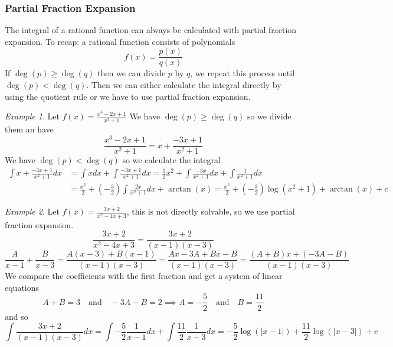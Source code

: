 \documentclass[english,titlepage]{uzhpub}
\theoremstyle{definition}
\theoremstyle{plain}
\theoremstyle{remark}
\theoremstyle{example}
\newtheorem*{example}{Example}
\begin{document}
   \subsubsection{Partial Fraction Expansion}
   The integral of a rational function can always be calculated with partial fraction expansion.
   To recap: a rational function consists of polynomials
   \[f(x) = \frac{p(x)}{q(x)}\]
   If \(\deg(p) \geq \deg(q)\) then we can divide \(p\) by \(q\), we repeat this process until \(\deg(p) < \deg(q)\).
   Then we can either calculate the integral directly by using the quotient rule or we have to use partial fraction expansion.
   \begin{example}
      Let \(f(x) = \frac{x^3 - 2x + 1}{x^2 + 1}\)
      We have \(\deg(p) \geq \deg(q)\) so we divide them an have
      \[\frac{x^3 - 2x + 1}{x^2 + 1} = x + \frac{-3x + 1}{x^2 + 1}\]
      We have \(\deg(p) < \deg(q)\) so we calculate the integral
      \begin{equation*}
         \begin{split}
            \int x + \frac{-3x + 1}{x^2 + 1} dx & = \int xdx + \int \frac{-3x + 1}{x^2 + 1} dx = \frac{1}{2}x^2 + \int \frac{-3x}{x^2 + 1} dx + \int \frac{1}{x^2 + 1} dx\\
                                                & = \frac{x^2}{2} + \left(-\frac{3}{2}\right) \int \frac{2x}{x^2 + 1} dx + \arctan(x) = \frac{x^2}{2} + \left(-\frac{3}{2}\right) \log(x^2 + 1) + \arctan(x) + c
         \end{split}
      \end{equation*}
   \end{example}

   \begin{example}
      Let \(f(x) = \frac{3x+2}{x^2 - 4x + 3}\), this is not directly solvable, so we use partial fraction expansion.
      \[\frac{3x+2}{x^2 - 4x + 3} = \frac{3x+2}{(x-1)(x-3)}\]
      \[\frac{A}{x-1} + \frac{B}{x-3} = \frac{A(x-3) + B(x-1)}{(x-1)(x-3)} = \frac{Ax - 3A + Bx - B}{(x-1)(x-3)} = \frac{(A + B)x + (-3A - B)}{(x-1)(x-3)}\]
      We compare the coefficients with the first fraction and get a system of linear equations
      \[A + B = 3 \quad\text{and}\quad -3A - B = 2 \implies A= -\frac{5}{2} \quad\text{and}\quad B = \frac{11}{2}\]
      and so
      \[\int \frac{3x+2}{(x-1)(x-3)}dx = \int -\frac{5}{2} \frac{1}{x-1}dx + \int \frac{11}{2} \frac{1}{x-3}dx = -\frac{5}{2} \log(|x-1|) + \frac{11}{2} \log(|x-3|) + c\]
   \end{example}
\end{document}

